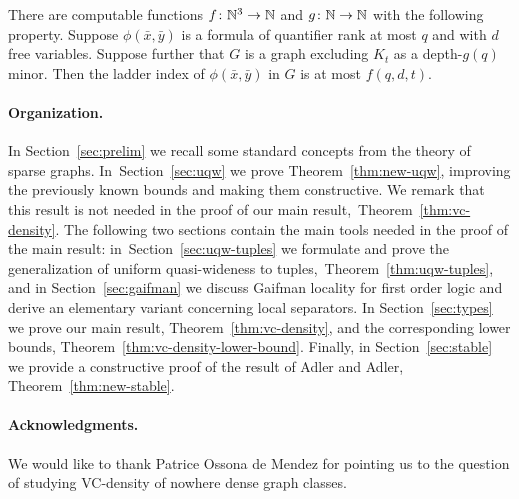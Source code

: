  \setcounter{stable}{\value{theorem}}
 \begin{theorem}\label{thm:new-stable}
There are computable functions $f\colon \mathbb{N}^3\to\mathbb{N}$ and $g\colon\mathbb{N}\to\mathbb{N}$ with the following property.
Suppose $\phi(\bar x,\bar y)$ is a formula of quantifier rank at most $q$ and with $d$ free variables.
Suppose further that $G$ is a graph excluding $K_t$ as a depth-$g(q)$ minor. Then the ladder index of $\phi(\bar x,\bar y)$ in $G$ is at most $f(q,d,t)$.
 \end{theorem}


\paragraph{Organization.} In Section~\ref{sec:prelim} we recall some standard concepts from the theory of sparse graphs.
In~Section~\ref{sec:uqw} we  prove Theorem~\ref{thm:new-uqw}, improving the previously known bounds and making them constructive. We remark that this result is not needed in the proof of our main result,~Theorem~\ref{thm:vc-density}. The following two sections
 contain the main tools needed in the proof of the main result:
in~Section~\ref{sec:uqw-tuples} we formulate and prove the generalization of uniform quasi-wideness to tuples,~Theorem~\ref{thm:uqw-tuples}, and 
in Section~\ref{sec:gaifman} we discuss Gaifman locality for first order logic and derive an elementary variant concerning local separators. 
In Section~\ref{sec:types} we prove our main result, Theorem~\ref{thm:vc-density}, and the corresponding lower bounds, Theorem~\ref{thm:vc-density-lower-bound}.
Finally, in Section~\ref{sec:stable} we provide a constructive proof of the result of Adler and Adler, Theorem~\ref{thm:new-stable}.

\paragraph{Acknowledgments.} We would like to
thank Patrice Ossona de Mendez for pointing us to the
question of studying VC-density of nowhere dense graph
classes.
